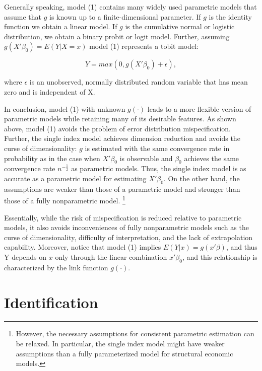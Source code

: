 \documentclass[a4paper]{article}
\begin{document}
Generally speaking, model (1) contains many widely used parametric models that assume that $g$ is known up to a finite-dimensional parameter. If $g$ is the identity function we obtain a linear model. If $g$ is the cumulative normal or logistic distribution, we obtain a binary probit or logit model. Further, assuming $g(X'\beta_0) = E(Y|X=x)$ model (1) represents a tobit model:


\[
    Y = max (0, g(X'\beta_0) + \epsilon),
\]

where $\epsilon$ is an unobserved, normally distributed random variable that has mean zero and is independent of X. 

In conclusion, model (1) with unknown $g(\cdot)$ leads to a more flexible version of parametric models while retaining many of its desirable features. As shown above, model (1) avoids the problem of error distribution mispecification. Further, the single index model achieves dimension reduction and avoids the curse of dimensionality: $g$ is estimated with the same convergence rate in probability as in the case when $X'\beta_0$ is observable and $\beta_0$ achieves the same convergence rate $n^{-\frac{1}{2}}$ as parametric models. Thus, the single index model is as accurate as a parametric model for estimating $X'\beta_0$. On the other hand, the assumptions are weaker than those of a parametric model and stronger than those of a fully nonparametric model.  \footnote{However, the necessary assumptions for consistent parametric estimation can be relaxed. In particular, the single index model might have weaker assumptions than a fully parameterized model for structural economic models.} %

Essentially, while the risk of mispecification is reduced relative to parametric models, it also avoids inconveniences of fully nonparametric models such as the curse of dimensionality, difficulty of interpretation, and the lack of extrapolation capability. Moreover, notice that model (1) implies $E(Y|x) = g(x'\beta)$, and thus Y depends on $x$ only through the linear combination $x'\beta_0$, and this relationship is characterized by the link function $g(\cdot)$.  %


\section{Identification} %
\label{sec:Identification}
\end{document}
